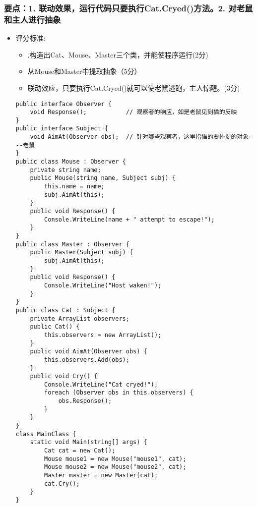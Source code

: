 \documentclass[9pt, b5paper]{article}
\begin{document}
\subsubsection{要点：1. 联动效果，运行代码只要执行Cat.Cryed()方法。2. 对老鼠和主人进行抽象}
\label{sec-1-2-135}
\begin{itemize}
\item 评分标准: 
\begin{itemize}
\item <1>.构造出Cat、Mouse、Master三个类，并能使程序运行(2分)
\item <2>从Mouse和Master中提取抽象（5分）
\item <3>联动效应，只要执行Cat.Cryed()就可以使老鼠逃跑，主人惊醒。(3分)
\end{itemize}
\begin{verbatim}
public interface Observer {
    void Response();           // 观察者的响应，如是老鼠见到猫的反映
}
public interface Subject {
    void AimAt(Observer obs);  // 针对哪些观察者，这里指猫的要扑捉的对象---老鼠
}
public class Mouse : Observer {
    private string name;
    public Mouse(string name, Subject subj) {           
        this.name = name;
        subj.AimAt(this);
    }
    public void Response() {
        Console.WriteLine(name + " attempt to escape!");
    }
}
public class Master : Observer {   
    public Master(Subject subj) {           
        subj.AimAt(this);
    }
    public void Response() {
        Console.WriteLine("Host waken!");
    }  
}
public class Cat : Subject {
    private ArrayList observers;
    public Cat() {   
        this.observers = new ArrayList();
    }
    public void AimAt(Observer obs) {
        this.observers.Add(obs);
    }
    public void Cry() {
        Console.WriteLine("Cat cryed!");
        foreach (Observer obs in this.observers) {
            obs.Response();
        }
    }
}
class MainClass {       
    static void Main(string[] args) {
        Cat cat = new Cat();
        Mouse mouse1 = new Mouse("mouse1", cat);
        Mouse mouse2 = new Mouse("mouse2", cat);
        Master master = new Master(cat);
        cat.Cry();
    }
}


\end{verbatim}
\end{itemize}
\end{document}
